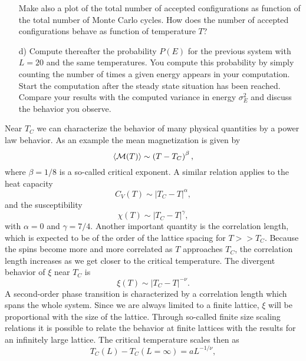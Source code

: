 \documentclass[11pt,a4wide]{article}
\begin{document}
\begin{enumerate}
Make also a plot of the total number of accepted configurations 
as function of the total number of Monte Carlo cycles. How does the number of
accepted configurations behave as function of temperature $T$?


\item[d)] Compute thereafter the probability 
$P(E)$ for the previous system with $L=20$ and the same temperatures.
You compute this probability by simply counting the number of times a 
given energy appears in your computation. Start the computation after 
the steady state situation has been reached.
Compare your results with the computed variance in energy 
$\sigma^2_E$ and discuss the behavior you observe. 
\end{enumerate}

Near $T_C$ we can characterize the behavior of many physical quantities
by a power law behavior.
As an example the mean magnetization is given by
\begin{equation}
  \langle {\cal M}(T) \rangle \sim \left(T-T_C\right)^{\beta},
\end{equation}
where $\beta=1/8$ is a so-called critical exponent. A similar relation
applies to the heat capacity 
\begin{equation}
  C_V(T) \sim \left|T_C-T\right|^{\alpha},
\end{equation}
and the susceptibility
\begin{equation}
  \chi(T) \sim \left|T_C-T\right|^{\gamma},
\end{equation}
with $\alpha = 0$ and $\gamma = 7/4$.
Another important quantity is the correlation length, which is expected
to be of the order of the lattice spacing for $T>> T_C$. Because the spins
become more and more correlated as $T$ approaches $T_C$, the correlation
length increases as we get closer to the critical temperature. The divergent
behavior of $\xi$ near $T_C$ 
is
\begin{equation}
  \xi(T) \sim \left|T_C-T\right|^{-\nu}.
  \label{eq:xi}
\end{equation}
A second-order phase transition is characterized by a
correlation length which spans the whole system.
Since we are always limited to a finite lattice, $\xi$ will
be proportional with the size of the lattice. 
Through so-called finite size scaling relations
it is possible to relate the behavior at finite lattices with the 
results for an infinitely large lattice.
The critical temperature scales then as
\begin{equation}
 T_C(L)-T_C(L=\infty) = aL^{-1/\nu},
 \label{eq:tc}
\end{equation}
\end{document}
